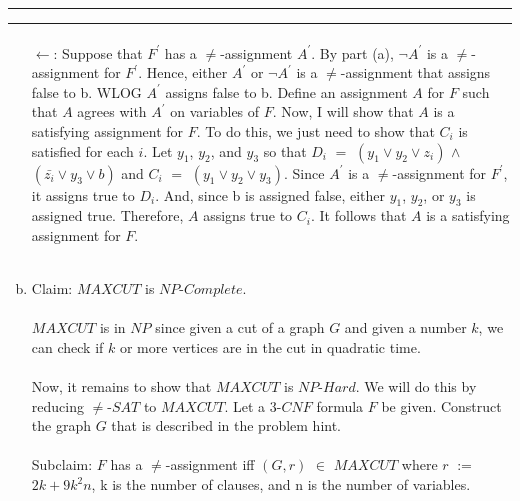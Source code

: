 \documentclass[11pt]{article}
\newcounter{questionCounter}
\newcounter{partCounter}[questionCounter]
\newenvironment{question}[2][\arabic{questionCounter}]{%
    \setcounter{partCounter}{0}%
    \vspace{.25in} \hrule \vspace{0.5em}%
        \noindent{\bf #2}%
    \vspace{0.8em} \hrule \vspace{.10in}%
    \addtocounter{questionCounter}{1}%
}{}
\begin{document}
\begin{question}{NP-Completeness}
\begin{enumerate}[(a)]
\paragraph{}
$\leftarrow$:  Suppose that $F^{\prime}$ has a $\neq$-assignment $A^{\prime}$.  By part (a), $\neg A^{\prime}$ is a $\neq$-assignment for $F^{\prime}$.  Hence, either $A^{\prime}$ or $\neg A^{\prime}$ is a $\neq$-assignment that assigns false to b.  WLOG $A^{\prime}$ assigns false to b.  Define an assignment $A$ for $F$ such that $A$ agrees with $A^{\prime}$ on variables of $F$.  Now, I will show that $A$ is a satisfying assignment for $F$.  To do this, we just need to show that $C_{i}$ is satisfied for each $i$.  Let $y_{1}$, $y_{2}$, and $y_{3}$ so that $D_{i}$ $=$ $(y_{1} \vee y_{2} \vee z_{i})$ $\wedge$ $(\bar{z_{i}} \vee y_{3} \vee b)$ and $C_{i}$ $=$ $(y_{1} \vee y_{2} \vee y_{3})$.  Since $A^{\prime}$ is a $\neq$-assignment for $F^{\prime}$, it assigns true to $D_{i}$.  And, since b is assigned false, either $y_{1}$, $y_{2}$, or $y_{3}$ is assigned true.  Therefore, $A$ assigns true to $C_{i}$.  It follows that $A$ is a satisfying assignment for $F$.
\\\\
\item Claim: $MAXCUT$ is $NP$-$Complete$.

\paragraph{}
$MAXCUT$ is in $NP$ since given a cut of a graph $G$ and given a number $k$, we can check if $k$ or more vertices are in the cut in quadratic time.

\paragraph{}
Now, it remains to show that $MAXCUT$ is $NP$-$Hard$.  We will do this by reducing $\neq$-$SAT$ to $MAXCUT$.  Let a $3$-$CNF$ formula $F$ be given.  Construct the graph $G$ that is described in the problem hint.

\paragraph{}
Subclaim: $F$ has a $\neq$-assignment iff $(G,r)$ $\in$ $MAXCUT$ where $r$ $:=$ $2k + 9k^{2}n$, k is the number of clauses, and n is the number of variables.


\end{enumerate}
\end{question}
\end{document}
